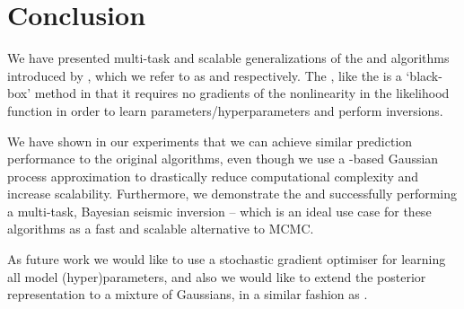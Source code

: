 \section{Conclusion}

We have presented multi-task and scalable generalizations of the \egp and \ugp
algorithms introduced by \citet{steinberg-bonilla-nips-2014}, which we refer to
as \eks and \uks respectively. The \uks, like the \ugp is a `black-box' method
in that it requires no gradients of the nonlinearity in the likelihood
function in order to learn parameters/hyperparameters and perform inversions.

We have shown in our experiments that we can achieve similar prediction
performance to the original algorithms, even though we use a \rks-based
Gaussian process approximation to drastically reduce computational complexity
and increase scalability. Furthermore, we demonstrate the \eks and \uks
successfully performing a multi-task, Bayesian seismic inversion -- which is
an ideal use case for these algorithms as a fast and scalable alternative to
MCMC.

As future work we would like to use a stochastic gradient optimiser for
learning all model (hyper)parameters, and also we would like to extend the
posterior representation to a mixture of Gaussians, in a similar fashion as
\cite{nguyen-bonilla-uai-2014, gershman-et-al-icml-12}.
